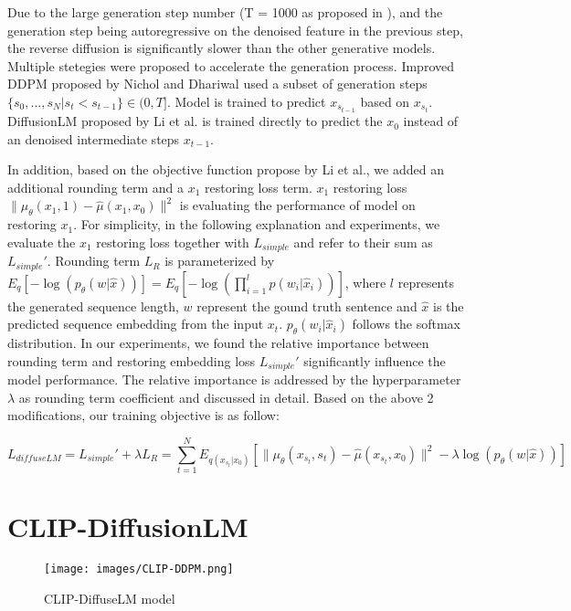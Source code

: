 \documentclass{article}
\begin{document}
Due to the large generation step number (T = 1000 as proposed in \cite{ddpm}), and the generation step being autoregressive on the denoised feature in the previous step, the reverse diffusion is significantly slower than the other generative models\cite{gan, vae}. Multiple stetegies were proposed to accelerate the generation process. Improved DDPM proposed by Nichol and Dhariwal\cite{improved-ddpm} used a subset of generation steps $\{s_0, ..., s_N | s_t < s_{t-1}\} \in (0, T]$. Model is trained to predict $x_{s_{t-1}}$ based on $x_{s_t}$. DiffusionLM proposed by Li et al.\cite{diffuselm} is trained directly to predict the $x_0$ instead of an denoised intermediate steps $x_{t-1}$.

In addition, based on the objective function propose by Li et al.\cite{diffuselm}, we added an additional rounding term and a $x_1$ restoring loss term. $x_1$ restoring loss $\|\mu_{\theta}(x_1, 1) - \hat{\mu}(x_1, x_0)\|^2$ is evaluating the performance of model on restoring $x_1$. For simplicity, in the following explanation and experiments, we evaluate the $x_1$ restoring loss together with $L_{simple}$ and refer to their sum as $L_{simple}'$. Rounding term $L_R$ is parameterized by $E_q[-\log(p_{\theta}(w | \hat{x}))] = E_q[-\log(\prod_{i=1}^l p(w_i | \hat{x}_i))]$, where $l$ represents the generated sequence length, $w$ represent the gound truth sentence and $\hat{x}$ is the predicted sequence embedding from the input $x_t$. $p_{\theta}(w_i | \hat{x}_i)$ follows the softmax distribution. In our experiments, we found the relative importance between rounding term and restoring embedding loss $L_{simple}'$ significantly influence the model performance. The relative importance is addressed by the hyperparameter $\lambda$ as rounding term coefficient and discussed in detail{}. Based on the above 2 modifications, our training objective is as follow:

$$L_{diffuseLM} = L_{simple}' + \lambda L_R = \sum_{t=1}^{N} E_{q(x_{s_t} | x_0)} [\|\mu_{\theta}(x_{s_t}, s_t) - \hat{\mu}(x_{s_t}, x_0)\|^2 -\lambda\log(p_{\theta}(w | \hat{x}))]$$


\section{CLIP-DiffusionLM}
\begin{figure}
    \centering
    \texttt{[image: images/CLIP-DDPM.png]}
    \caption{CLIP-DiffuseLM model}
\end{figure}
\end{document}
